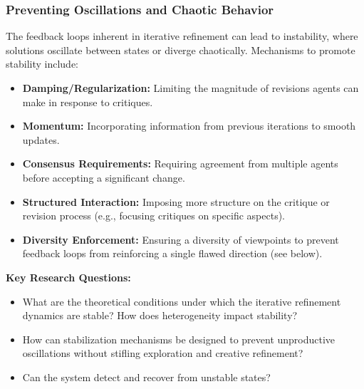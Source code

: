 \documentclass[12pt]{amsart}
\begin{document}
\subsubsection{Preventing Oscillations and Chaotic Behavior}
\label{subsubsec:oscillations}
The feedback loops inherent in iterative refinement can lead to instability, where solutions oscillate between states or diverge chaotically. Mechanisms to promote stability include:
\begin{itemize}[leftmargin=*]
    \item \textbf{Damping/Regularization:} Limiting the magnitude of revisions agents can make in response to critiques.
    \item \textbf{Momentum:} Incorporating information from previous iterations to smooth updates.
    \item \textbf{Consensus Requirements:} Requiring agreement from multiple agents before accepting a significant change.
    \item \textbf{Structured Interaction:} Imposing more structure on the critique or revision process (e.g., focusing critiques on specific aspects).
    \item \textbf{Diversity Enforcement:} Ensuring a diversity of viewpoints to prevent feedback loops from reinforcing a single flawed direction (see below).
\end{itemize}
\textbf{Key Research Questions:}
\begin{itemize}[leftmargin=*, label={--}]
    \item What are the theoretical conditions under which the iterative refinement dynamics are stable? How does heterogeneity impact stability?
    \item How can stabilization mechanisms be designed to prevent unproductive oscillations without stifling exploration and creative refinement?
    \item Can the system detect and recover from unstable states?
\end{itemize}
\end{document}

